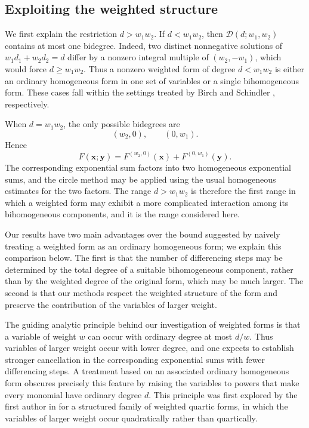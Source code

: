 \documentclass[12pt,reqno]{amsart}
\theoremstyle{definition}
\theoremstyle{remark}
\numberwithin{equation}{section}
\def\bfx{{\mathbf x}}
\def\bfy{{\mathbf y}}
\begin{document}
\subsection{Exploiting the weighted structure}
\label{subsec:comparison with Birch}

We first explain the restriction $d>w_1w_2$. If $d<w_1w_2$, then
$\mathcal D(d;w_1,w_2)$ contains at most one bidegree. Indeed, two distinct
nonnegative solutions of $w_1d_1+w_2d_2=d$ differ by a nonzero integral
multiple of $(w_2,-w_1)$, which would force $d\geq w_1w_2$. Thus a
nonzero weighted form of degree $d<w_1w_2$ is either an ordinary
homogeneous form in one set of variables or a single bihomogeneous form.
These cases fall within the settings treated by Birch \cite{Birch1962} and
Schindler \cite{Schindler2014,Schindler2016}, respectively.

When $d=w_1w_2$, the only possible bidegrees are
\[
    (w_2,0),
    \qquad
    (0,w_1).
\]
Hence
\[
    F(\bfx;\bfy)
    =F^{(w_2,0)}(\bfx)+F^{(0,w_1)}(\bfy).
\]
The corresponding exponential sum factors into two homogeneous
exponential sums, and the circle method may be applied using the usual
homogeneous estimates for the two factors. The range $d>w_1w_2$ is
therefore the first range in which a weighted form may exhibit a more
complicated interaction among its bihomogeneous components, and it is the
range considered here.

Our results have two main advantages over the bound suggested by naively
treating a weighted form as an ordinary homogeneous form; we explain this
comparison below.  The first is that the number of differencing steps may be
determined by the total degree of a suitable bihomogeneous component, rather
than by the weighted degree of the original form, which may be much larger.
The second is that our methods respect the weighted structure of the form and
preserve the contribution of the variables of larger weight.

The guiding analytic principle behind our investigation of weighted forms is
that a variable of weight $w$ can occur with ordinary degree at most $d/w$.
Thus variables of larger weight occur with lower degree, and one expects to
establish stronger cancellation in the corresponding exponential sums with
fewer differencing steps.  A treatment based on an associated ordinary
homogeneous form obscures precisely this feature by raising the variables to
powers that make every monomial have ordinary degree $d$.  This principle was
first explored by the first author in \cite{Flores2024} for a structured
family of weighted quartic forms, in which the variables of larger weight
occur quadratically rather than quartically.  
\end{document}
